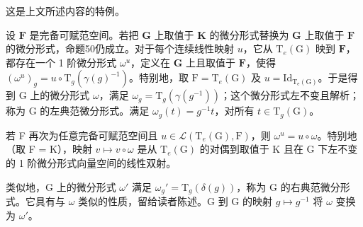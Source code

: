 这是上文所述内容的特例。

设 \(\mathbf{F}\) 是完备可赋范空间。若把 \(\mathbf{G}\) 上取值于 \(\mathbf{K}\) 的微分形式替换为 \(\mathbf{G}\) 上取值于 \(\mathbf{F}\) 的微分形式，命题50仍成立。对于每个连续线性映射 \(u\)，它从 \(\mathrm{T}_e(\mathrm{G})\) 映到 \(\mathbf{F}\)，都存在一个 1 阶微分形式 \(\omega^u\)，定义在 \(\mathbf{G}\) 上且取值于 \(\mathbf{F}\)，使得 \((\omega^{u})_{g} = u \circ \mathrm{T}_{g}(\gamma(g)^{-1})\)。特别地，取 \(\mathrm{F} = \mathrm{T}_e(\mathrm{G})\) 及 \(u = \mathrm{Id}_{\mathrm{T_e(G)}}\)。于是得到 G 上的微分形式 \(\omega\)，满足 \(\omega_{g} = \mathrm{T}_{g}(\gamma (g^{-1}))\)；这个微分形式左不变且解析；称为 G 的左典范微分形式。满足 \(\omega_{g}(t) = g^{-1}t\)，对所有 \(t\in \mathrm{T}_g(\mathrm{G})\)。

若 F 再次为任意完备可赋范空间且 \(u \in \mathcal{L}(\mathrm{T}_{e}(\mathrm{G}), \mathrm{F})\)，则 \(\omega^{u} = u \circ \omega\)。特别地（取 F = K），映射 \(v \mapsto v \circ \omega\) 是从 \(\mathrm{T}_{e}(\mathrm{G})\) 的对偶到取值于 K 且在 G 下左不变的 1 阶微分形式向量空间的线性双射。

类似地，G 上的微分形式 \(\omega'\) 满足 \(\omega_g' = \mathrm{T}_g(\delta(g))\)，称为 G 的右典范微分形式。它具有与 \(\omega\) 类似的性质，留给读者陈述。G 到 G 的映射 \(g \mapsto g^{-1}\) 将 \(\omega\) 变换为 \(\omega'\)。

